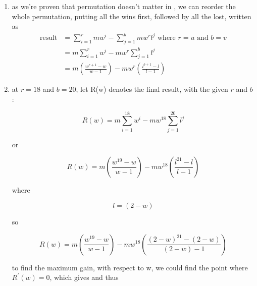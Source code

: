 \begin{enumerate}
\begin{proof}
\begin{enumerate}[label={}]
  after the swap, $B'_i = m \cdot w^u \cdot l^v$, and
  $B'_{i+1}$ would be $- m \cdot w^{u+1} \cdot l^v$.
  the sum of these two adjacent terms are
  \[
  B'_i + B'_{i+1} = m \cdot w^u \cdot l^v (1-w)
  \]

  we're given
  \[
  w + l = 2 \mapsto w = 2-l
  \]
  substitude (w) with (2-l) gives
  \[
  B'_i + B'_{i+1} = m \cdot w^u \cdot l^v (1-2+w) = m
  \cdot w^u \cdot l^v (w-1)
  \]
  thus $B_i + B_{i+1} = B'_i + B'_{i+1}$.
  \end{enumerate}

  as all cases of adjacent swap could maintain the
  final result, we could conclude that the final
  result is independent to the permutation of the
  cards.
  \end{proof}
  \item as we're proven that permutation doesn't matter in , we can reorder the whole permutation, putting all the wins first, followed by all the lost, written as
        \begin{align*}
            \text{result} &= \sum_{i = 1}^r mw^i - \sum_{j=1}^b mw^rl^j \text{ where } r = u \text{ and } b = v \\
            &= m\sum_{i=1}^r w^i - mw^r \sum_{j=1}^b l^j \\
            &= \boxed{m\left(\frac{w^{r+1} - w}{w-1}\right) - mw^r \left(\frac{l^{b+1} - l}{l-1}\right)}
        \end{align*} 

    \item at $r=18$ and $b = 20$, let R(w) denotes the final result, with the given $r$ and $b$: 

        \[R(w) = m\sum_{i=1}^{18} w^i - mw^{18} \sum_{j=1}^{20} l^j\]

        or

        \[R(w) = m\left(\frac{w^{19} - w}{w-1}\right) - mw^{18} \left(\frac{l^{21} - l}{l-1}\right)\]
    
        where 

        \[l = (2-w)\]

        so

        \[R(w) = m\left(\frac{w^{19} - w}{w-1}\right) - mw^{18} \left(\frac{(2-w)^{21} - (2-w)}{(2-w)-1}\right)\]

        to find the maximum gain, with respect to w, we could find the point where ${R^'}(w) = 0$, which gives  and thus 

  \end{enumerate}

